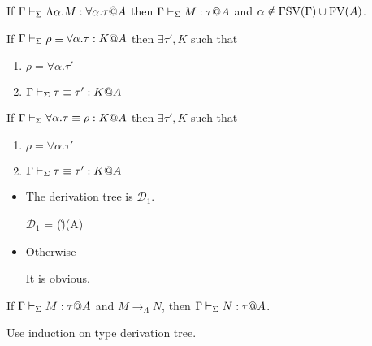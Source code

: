 \begin{lemma}
	\begin{item}
	      \item If $\G \V \Lambda\alpha.M : \forall\alpha.\tau@A$ then $\Gamma \vdash_\Sigma M : \tau @A$ and $\alpha \notin \text{FSV}(\Gamma) \cup \text{FV}(A)$.
	      \item If $\Gamma \vdash_\Sigma \rho \equiv \forall\alpha.\tau : K @A$ then $\exists \tau', K$ such that
	      \begin{enumerate}
	      	\item $\rho = \forall\alpha.\tau'$
	      	\item $\Gamma \vdash_\Sigma \tau \equiv \tau' : K @A$
	      \end{enumerate}
	      \item If $\Gamma \vdash_\Sigma \forall\alpha.\tau \equiv \rho : K @A$ then $\exists \tau', K$ such that
	      \begin{enumerate}
	      	\item $\rho = \forall\alpha.\tau'$
	      	\item $\Gamma \vdash_\Sigma \tau \equiv \tau' : K @A$
	      \end{enumerate}
	\end{item}
\end{lemma}

\begin{itemize}
	\newcommand{\MC}[1]{\mathcal{#1}}
	\item \TGen
	      	      
	      The derivation tree is $\MC{D}_1$.
	      	      
	      $\MC{D}_1$ = 
	      { \andalso \alpha \notin \FTV(\G)\cup\FTV(A)}
	      	      
	\item Otherwise
	      	      
	      It is obvious.
\end{itemize}

\begin{theorem}
	If $\G\V M:\tau@A$ and $M \longrightarrow_{\Lambda} N$, then $\G\V N:\tau@A$.
\end{theorem}

Use induction on type derivation tree.

